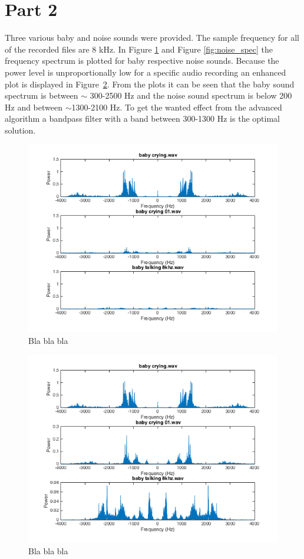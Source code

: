 \newpage
\section{Part 2}
Three various baby and noise sounds were provided. The sample frequency for all of the recorded 
files are 8 kHz. In Figure \ref{fig:baby_spec} and Figure \ref{fig:noise_spec} the frequency 
spectrum is plotted for baby respective noise sounds. Because the power level is unproportionally 
low for a specific audio recording an enhanced plot is displayed in Figure~\ref{fig:enhanced}. 
From the plots it can be seen that the baby sound spectrum is between $\sim$ 300-2500 Hz and the 
noise sound spectrum is below 200 Hz and between $\sim$1300-2100 Hz. To get the wanted effect from 
the advanced algorithm a bandpass filter with a band between 300-1300 Hz is the optimal solution. 

\begin{figure}[h]
  \centering
  \includegraphics[width=1\textwidth]{sections/freq_spec_baby_linkaxis.png}
  \caption{Bla bla bla}
  \label{fig:baby_spec}
\end{figure}

\begin{figure}[h]
  \centering
  \includegraphics[width=1\textwidth]{sections/freq_spec_babyFix.png}
  \caption{Bla bla bla}
  \label{fig:enhanced}
\end{figure}

